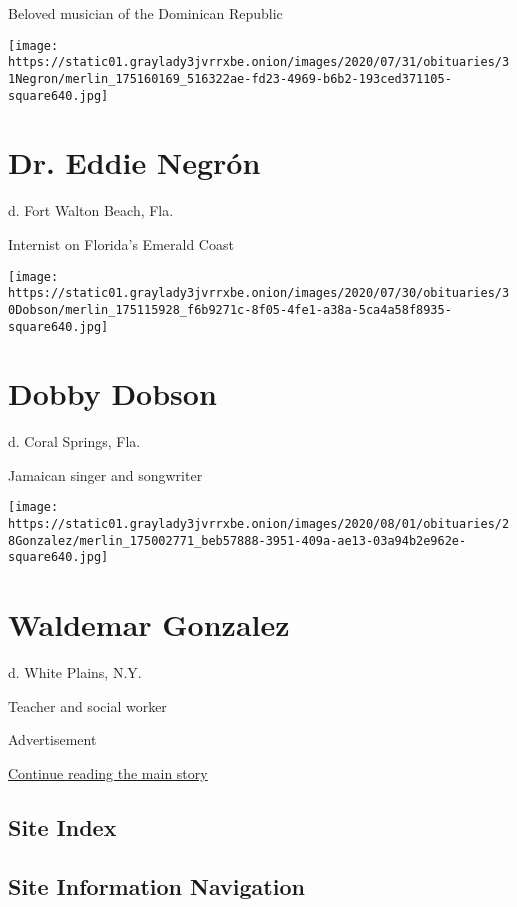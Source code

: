 Beloved musician of the Dominican Republic

\texttt{[image: https://static01.graylady3jvrrxbe.onion/images/2020/07/31/obituaries/31Negron/merlin\_175160169\_516322ae-fd23-4969-b6b2-193ced371105-square640.jpg]}

\hypertarget{dr-eddie-negruxf3n}{%
\section{Dr. Eddie Negrón}\label{dr-eddie-negruxf3n}}

d. Fort Walton Beach, Fla.

Internist on Florida's Emerald Coast

\texttt{[image: https://static01.graylady3jvrrxbe.onion/images/2020/07/30/obituaries/30Dobson/merlin\_175115928\_f6b9271c-8f05-4fe1-a38a-5ca4a58f8935-square640.jpg]}

\hypertarget{dobby-dobson}{%
\section{Dobby Dobson}\label{dobby-dobson}}

d. Coral Springs, Fla.

Jamaican singer and songwriter

\texttt{[image: https://static01.graylady3jvrrxbe.onion/images/2020/08/01/obituaries/28Gonzalez/merlin\_175002771\_beb57888-3951-409a-ae13-03a94b2e962e-square640.jpg]}

\hypertarget{waldemar-gonzalez}{%
\section{Waldemar Gonzalez}\label{waldemar-gonzalez}}

d. White Plains, N.Y.

Teacher and social worker

Advertisement

\protect\hyperlink{after-bottom}{Continue reading the main story}

\hypertarget{site-index}{%
\subsection{Site Index}\label{site-index}}

\hypertarget{site-information-navigation}{%
\subsection{Site Information
Navigation}\label{site-information-navigation}}

